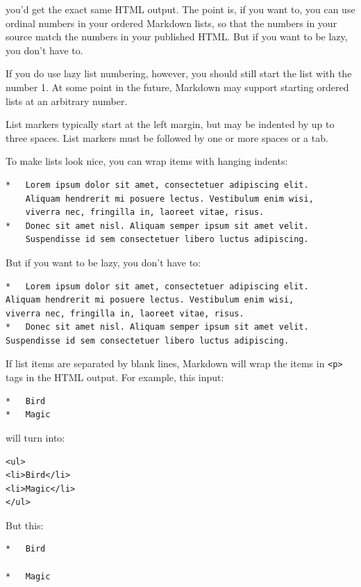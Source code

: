 you'd get the exact same HTML output. The point is, if you want to,
you can use ordinal numbers in your ordered Markdown lists, so that
the numbers in your source match the numbers in your published HTML.
But if you want to be lazy, you don't have to.

If you do use lazy list numbering, however, you should still start the
list with the number 1. At some point in the future, Markdown may support
starting ordered lists at an arbitrary number.

List markers typically start at the left margin, but may be indented by
up to three spaces. List markers must be followed by one or more spaces
or a tab.

To make lists look nice, you can wrap items with hanging indents:

\begin{verbatim}
*   Lorem ipsum dolor sit amet, consectetuer adipiscing elit.
    Aliquam hendrerit mi posuere lectus. Vestibulum enim wisi,
    viverra nec, fringilla in, laoreet vitae, risus.
*   Donec sit amet nisl. Aliquam semper ipsum sit amet velit.
    Suspendisse id sem consectetuer libero luctus adipiscing.
\end{verbatim}

But if you want to be lazy, you don't have to:

\begin{verbatim}
*   Lorem ipsum dolor sit amet, consectetuer adipiscing elit.
Aliquam hendrerit mi posuere lectus. Vestibulum enim wisi,
viverra nec, fringilla in, laoreet vitae, risus.
*   Donec sit amet nisl. Aliquam semper ipsum sit amet velit.
Suspendisse id sem consectetuer libero luctus adipiscing.
\end{verbatim}

If list items are separated by blank lines, Markdown will wrap the
items in \texttt{<p>} tags in the HTML output. For example, this input:

\begin{verbatim}
*   Bird
*   Magic
\end{verbatim}

will turn into:

\begin{verbatim}
<ul>
<li>Bird</li>
<li>Magic</li>
</ul>
\end{verbatim}

But this:

\begin{verbatim}
*   Bird

*   Magic
\end{verbatim}

